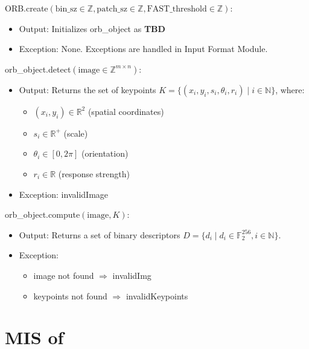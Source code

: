 \documentclass[12pt, titlepage]{article}
\begin{document}
\noindent ORB.create$(\text{bin\_sz} \in \mathbb{Z}, \text{patch\_sz} \in \mathbb{Z}, \text{FAST\_threshold} \in \mathbb{Z})$:
\begin{itemize}
    \item Output: Initializes orb\_object as \textbf{TBD}
    \item Exception: None. Exceptions are handled in Input Format Module.
\end{itemize}

\noindent orb\_object.detect$(\text{image} \in \mathbb{Z}^{m \times n})$:
\begin{itemize}
    \item Output: Returns the set of keypoints \( K = \{ (x_i, y_i, s_i, \theta_i, r_i) \mid i \in \mathbb{N} \} \), where:
    \begin{itemize}
        \item \( (x_i, y_i) \in \mathbb{R}^2 \) (spatial coordinates)
        \item \( s_i \in \mathbb{R}^+ \) (scale)
        \item \( \theta_i \in [0, 2\pi] \) (orientation)
        \item \( r_i \in \mathbb{R} \) (response strength)
    \end{itemize}
    \item Exception: invalidImage
\end{itemize}

\noindent orb\_object.compute$(\text{image}, K)$:
\begin{itemize}
    \item Output: Returns a set of binary descriptors \( D = \{ d_i \mid d_i \in \mathbb{F}_2^{256}, i \in \mathbb{N} \} \).
    \item Exception:
    \begin{itemize}
      \item image not found $\Rightarrow$ invalidImg
      \item keypoints not found $\Rightarrow$ invalidKeypoints
    \end{itemize}
\end{itemize}






\section{MIS of } \label{Module} 

\end{document}
